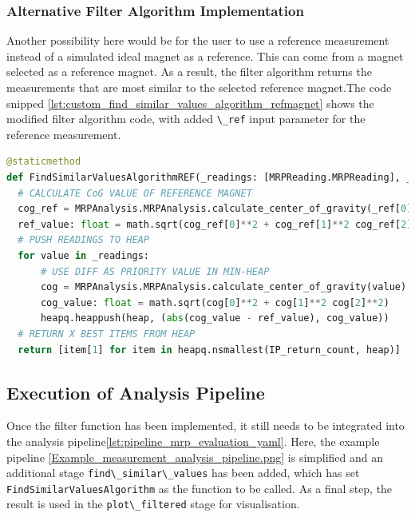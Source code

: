 \hypertarget{alternative-filter-algorithm-implementation}{%
\subsubsection{Alternative Filter Algorithm
Implementation}\label{alternative-filter-algorithm-implementation}}

Another possibility here would be for the user to use a reference
measurement instead of a simulated ideal magnet as a reference. This can
come from a magnet selected as a reference magnet. As a result, the
filter algorithm returns the measurements that are most similar to the
selected reference magnet.The code snipped
\ref{lst:custom_find_similar_values_algorithm_refmagnet} shows the
modified filter algorithm code, with added
\passthrough{\lstinline!\_ref!} input parameter for the reference
measurement.

\begin{lstlisting}[language=Python, caption={Modified user implemented custom find algorithm using a reference magnet reading}, label=lst:custom_find_similar_values_algorithm_refmagnet]
@staticmethod
def FindSimilarValuesAlgorithmREF(_readings: [MRPReading.MRPReading], _ref: [MRPReading.MRPReading], IP_return_count: int = 4) -> [MRPReading.MRPReading]:
  # CALCULATE CoG VALUE OF REFERENCE MAGNET
  cog_ref = MRPAnalysis.MRPAnalysis.calculate_center_of_gravity(_ref[0])
  ref_value: float = math.sqrt(cog_ref[0]**2 + cog_ref[1]**2 cog_ref[2]**2)
  # PUSH READINGS TO HEAP
  for value in _readings:
      # USE DIFF AS PRIORITY VALUE IN MIN-HEAP
      cog = MRPAnalysis.MRPAnalysis.calculate_center_of_gravity(value)
      cog_value: float = math.sqrt(cog[0]**2 + cog[1]**2 cog[2]**2)
      heapq.heappush(heap, (abs(cog_value - ref_value), cog_value))
  # RETURN X BEST ITEMS FROM HEAP
  return [item[1] for item in heapq.nsmallest(IP_return_count, heap)]
\end{lstlisting}

\hypertarget{execution-of-analysis-pipeline}{%
\subsection{Execution of Analysis
Pipeline}\label{execution-of-analysis-pipeline}}

Once the filter function has been implemented, it still needs to be
integrated into the analysis
pipeline\ref{lst:pipeline_mrp_evaluation_yaml}. Here, the example
pipeline \ref{Example_measurement_analysis_pipeline.png} is simplified
and an additional stage \passthrough{\lstinline!find\_similar\_values!}
has been added, which has set
\passthrough{\lstinline!FindSimilarValuesAlgorithm!} as the function to
be called. As a final step, the result is used in the
\passthrough{\lstinline!plot\_filtered!} stage for visualisation.


